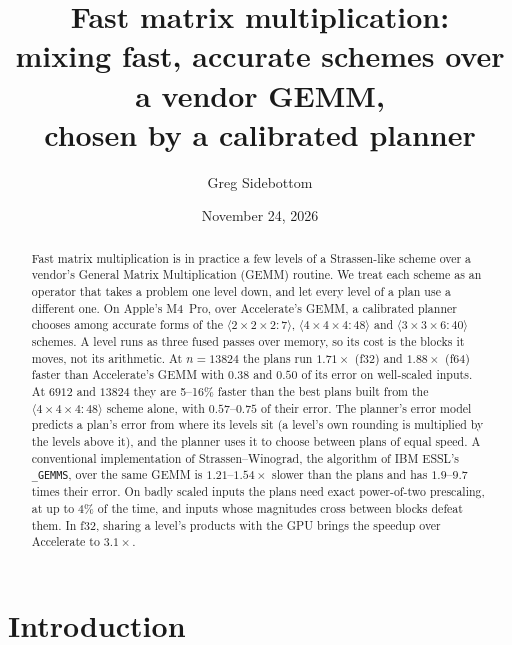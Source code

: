 \documentclass[11pt]{article}
\title{Fast matrix multiplication:\\
mixing fast, accurate schemes over a vendor GEMM,\\
chosen by a calibrated planner}
\author{Greg Sidebottom}
\date{November 24, 2026}
\newcommand{\mm}[1]{\langle #1\rangle}
\begin{document}
\maketitle

\begin{abstract}
Fast matrix multiplication is in practice a few levels of a Strassen-like
scheme over a vendor's General Matrix Multiplication (GEMM) routine.  We
treat each scheme as an operator that takes a problem one level down, and
let every level of a plan use a different one.  On Apple's M4~Pro, over
Accelerate's GEMM, a calibrated planner chooses among accurate forms of the
$\mm{2\times2\times2:7}$, $\mm{4\times4\times4:48}$ and
$\mm{3\times3\times6:40}$ schemes.  A level runs as three fused passes over
memory, so its cost is the blocks it moves, not its arithmetic.  At
$n=13824$ the plans run $1.71\times$ (f32) and $1.88\times$ (f64) faster than
Accelerate's GEMM with $0.38$ and $0.50$ of its error on well-scaled inputs.  At $6912$ and
$13824$ they are 5--16\% faster than the best plans built from the
$\mm{4\times4\times4:48}$ scheme alone, with $0.57$--$0.75$ of their error.
The planner's error model predicts a plan's error from where its levels sit
(a level's own rounding is multiplied by the levels above it), and the
planner uses it to choose between plans of equal speed.
A conventional implementation of Strassen--Winograd, the algorithm of IBM ESSL's \texttt{\_GEMMS}, over the same GEMM is $1.21$--$1.54\times$ slower than the plans and has $1.9$--$9.7$ times their error.  On badly scaled inputs the plans need exact power-of-two prescaling,
at up to 4\% of the time, and inputs whose magnitudes cross between blocks
defeat them.  In f32, sharing a level's products with the GPU brings the
speedup over Accelerate to $3.1\times$.
\end{abstract}

\section{Introduction}\label{sec:intro}
\end{document}
